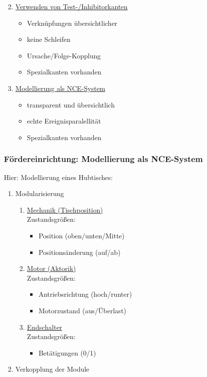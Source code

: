 \begin{enumerate}
	\setcounter{enumi}{1}
	\item \underline{Verwenden von Test-/Inhibitorkanten}
	
	\begin{itemize}
		\item Verknüpfungen übersichtlicher
		\item keine Schleifen
		\item Ursache/Folge-Kopplung
		\item Spezialkanten vorhanden
	\end{itemize}
	
	\item \underline{Modellierung als NCE-System}
	
	\begin{itemize}
		\item transparent und übersichtlich
		\item echte Ereignisparalellität
		\item Spezialkanten vorhanden
	\end{itemize}
\end{enumerate}

\subsubsection{Fördereinrichtung: Modellierung als NCE-System}
Hier: Modellierung eines Hubtisches: 

\begin{enumerate}
	\item Modularisierung
	\begin{enumerate}
		\item \underline{Mechanik (Tischposition)}\\
		Zustandsgrößen:
		\begin{itemize}
			\item Position (oben/unten/Mitte)
			\item Positionsänderung (auf/ab)
		\end{itemize}
		\item \underline{Motor (Aktorik)}\\
		Zustandsgrößen:
		\begin{itemize}
			\item Antriebsrichtung (hoch/runter)
			\item Motorzustand (aus/Überlast)
		\end{itemize}
		\item \underline{Endschalter}\\
		Zustandsgrößen:
		\begin{itemize}
			\item Betätigungen (0/1)
		\end{itemize}
	\end{enumerate}
	\item Verkopplung der Module
\end{enumerate}

